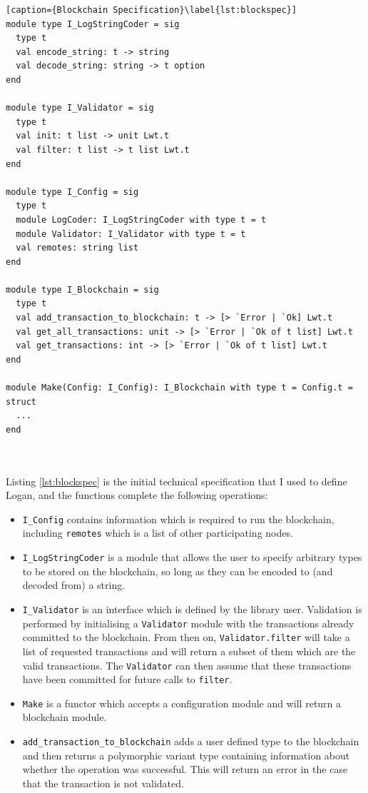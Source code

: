 \documentclass[12pt,a4paper,twoside,openright]{report}
\begin{document}
	\begin{minipage}{\linewidth}
	\begin{lstlisting}[caption={Blockchain Specification}\label{lst:blockspec}]
module type I_LogStringCoder = sig
  type t
  val encode_string: t -> string
  val decode_string: string -> t option
end

module type I_Validator = sig 
  type t 
  val init: t list -> unit Lwt.t 
  val filter: t list -> t list Lwt.t
end

module type I_Config = sig
  type t
  module LogCoder: I_LogStringCoder with type t = t
  module Validator: I_Validator with type t = t
  val remotes: string list
end

module type I_Blockchain = sig
  type t
  val add_transaction_to_blockchain: t -> [> `Error | `Ok] Lwt.t
  val get_all_transactions: unit -> [> `Error | `Ok of t list] Lwt.t
  val get_transactions: int -> [> `Error | `Ok of t list] Lwt.t
end

module Make(Config: I_Config): I_Blockchain with type t = Config.t = struct 
  ...
end
	\end{lstlisting}
	\end{minipage}\\
	\\
	Listing \ref{lst:blockspec} is the initial technical specification that I used to define Logan, and the functions complete the following operations:
	\begin{itemize}
		\item \texttt{I\_Config} contains information which is required to run the blockchain, including \texttt{remotes} which is a list of other participating nodes.
		\item \texttt{I\_LogStringCoder} is a module that allows the user to specify arbitrary types to be stored on the blockchain, so long as they can be encoded to (and decoded from) a string.
		\item \texttt{I\_Validator} is an interface which is defined by the library user. 
		Validation is performed by initialising a \texttt{Validator} module with the transactions already committed to the blockchain.
		From then on, \texttt{Validator.filter} will take a list of requested transactions and will return a subset of them which are the valid transactions.
		The \texttt{Validator} can then assume that these transactions have been committed for future calls to \texttt{filter}.
		\item \texttt{Make} is a functor which accepts a configuration module and will return a blockchain module.
		\item \texttt{add\_transaction\_to\_blockchain} adds a user defined type to the blockchain and then returns a polymorphic variant type containing information about whether the operation was successful. 
		This will return an error in the case that the transaction is not validated.
	\end{itemize} 
\end{document}
